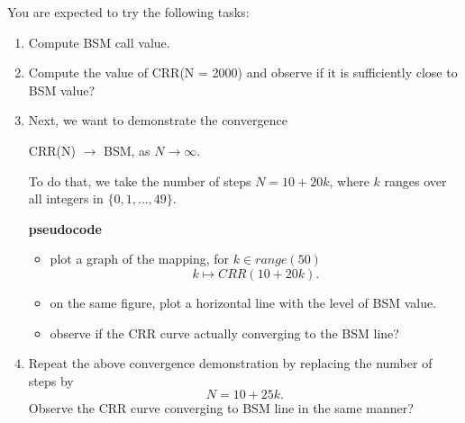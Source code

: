 \documentclass{article}
\begin{document}
You are expected to try the following tasks:
\begin{enumerate}
 \item Compute BSM call value.
 \item Compute the value of CRR(N = 2000) and observe if it is sufficiently close to BSM value?
 \item Next, we want to demonstrate the convergence 
\begin{center}
 CRR(N) $\to$ BSM, as $N\to \infty$.
\end{center} 
To do that, we take the number of steps 
$N = 10 + 20k$, where $k$ ranges over all integers in $\{0, 1, \ldots, 49\}$.

{\bf pseudocode} 
\begin{itemize}
\item plot a graph of the mapping, for $k \in range(50)$
$$k \mapsto CRR(10 + 20k).$$ 
\item on the same figure, plot a horizontal line with the level of BSM value.
\item observe if the CRR curve actually converging to the BSM line?
\end{itemize}

\item Repeat the above convergence demonstration by replacing the number of steps by
$$N = 10 + 25 k.$$
Observe the CRR curve converging to BSM line in the same manner?

\end{enumerate}


%
%
%
%
\end{document}
